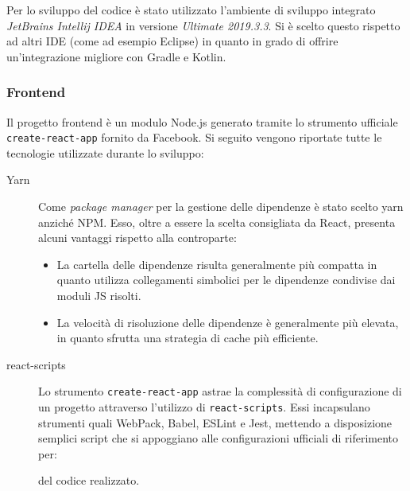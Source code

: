         Per lo sviluppo del codice è stato utilizzato l'ambiente di sviluppo integrato \emph{JetBrains Intellij IDEA} in versione \emph{Ultimate 2019.3.3}.
        Si è scelto questo rispetto ad altri IDE (come ad esempio Eclipse) in quanto in grado di offrire un'integrazione migliore con Gradle e Kotlin.

      \subsubsection{Frontend}

        Il progetto frontend è un modulo Node.js generato tramite lo strumento ufficiale \texttt{create-react-app} fornito da Facebook.
        Si seguito vengono riportate tutte le tecnologie utilizzate durante lo sviluppo:

        \begin{description}
          \item[Yarn]
            Come \emph{package manager} per la gestione delle dipendenze è stato scelto yarn anziché NPM\@.
            Esso, oltre a essere la scelta consigliata da React, presenta alcuni vantaggi rispetto alla controparte:
            \begin{itemize}
              \item La cartella delle dipendenze risulta generalmente più compatta in quanto utilizza collegamenti simbolici per le dipendenze condivise dai moduli JS risolti.
              \item La velocità di risoluzione delle dipendenze è generalmente più elevata, in quanto sfrutta una strategia di cache più efficiente.
            \end{itemize}

          \item[react-scripts]
            Lo strumento \texttt{create-react-app} astrae la complessità di configurazione di un progetto attraverso l'utilizzo di \texttt{react-scripts}.
            Essi incapsulano strumenti quali WebPack, Babel, ESLint e Jest, mettendo a disposizione semplici script che si appoggiano alle configurazioni ufficiali di riferimento per:
            del codice realizzato.


\end{description}
